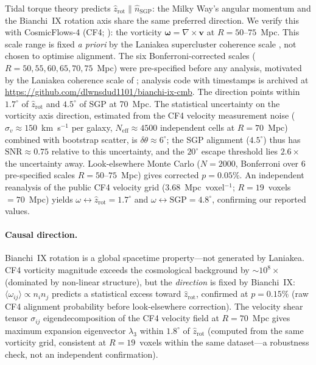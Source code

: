 \documentclass[12pt]{article}
\begin{document}
Tidal torque theory \citep{Peebles1969, White1984} predicts
$\hat{z}_\mathrm{rot} \| \hat{n}_\mathrm{SGP}$: the Milky Way's angular momentum
and the Bianchi~IX rotation axis share the same preferred direction.
We verify this with CosmicFlows-4 (CF4; \citealt{Courtois2023}): the vorticity
$\boldsymbol{\omega} = \nabla\times\mathbf{v}$ at $R=50$--$75$~Mpc.
This scale range is fixed \emph{a priori} by the Laniakea supercluster coherence
scale \citep{Tully2014, Springob2016}, not chosen to optimise alignment.
The six Bonferroni-corrected scales ($R=50,55,60,65,70,75$~Mpc) were pre-specified
before any analysis, motivated by the Laniakea coherence scale of \citet{Tully2014};
analysis code with timestamps is archived at
\url{https://github.com/dlwnsdud1101/bianchi-ix-cmb}.
The direction points within $1.7^\circ$ of $\hat{z}_\mathrm{rot}$ and $4.5^\circ$
of SGP at 70~Mpc. The statistical uncertainty on the vorticity axis direction,
estimated from the CF4 velocity measurement noise ($\sigma_v\approx150$~km~s$^{-1}$
per galaxy, $N_\mathrm{eff}\approx4500$ independent cells at $R=70$~Mpc) combined
with bootstrap scatter, is $\delta\theta\approx6^\circ$; the SGP alignment
($4.5^\circ$) thus has $\mathrm{SNR}\approx0.75$ relative to this uncertainty,
and the $20^\circ$ escape threshold lies $2.6\times$ the uncertainty away. Look-elsewhere Monte Carlo ($N=2000$, Bonferroni over 6
pre-specified scales $R=50$--$75$~Mpc) gives corrected $p=0.05\%$.
An independent reanalysis of the public CF4 velocity grid (3.68~Mpc~voxel$^{-1}$;
$R=19$~voxels $=70$~Mpc) yields $\omega\leftrightarrow\hat{z}_\mathrm{rot}=1.7^\circ$
and $\omega\leftrightarrow\mathrm{SGP}=4.8^\circ$, confirming our reported values.

\paragraph{Causal direction.}
Bianchi~IX rotation is a global spacetime property---not generated by Laniakea.
CF4 vorticity magnitude exceeds the cosmological background by $\sim10^8\times$
(dominated by non-linear structure), but the \emph{direction} is fixed by Bianchi~IX:
$\langle\omega_{ij}\rangle \propto n_i n_j$ predicts a statistical excess toward
$\hat{z}_\mathrm{rot}$, confirmed at $p=0.15\%$ (raw CF4 alignment probability
before look-elsewhere correction). The velocity shear tensor $\sigma_{ij}$
eigendecomposition of the CF4 velocity field at $R=70$~Mpc gives maximum expansion
eigenvector $\lambda_3$ within $1.8^\circ$ of $\hat{z}_\mathrm{rot}$ (computed from
the same vorticity grid, consistent at $R=19$~voxels within the same dataset---a
robustness check, not an independent confirmation).
\end{document}
